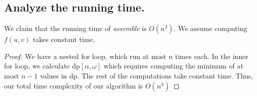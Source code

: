 \documentclass[11pt]{scrartcl}
\begin{document}
\subsection{
	Analyze the running time.
}
We claim that the running time of \textit{assemble} is $O(n^3)$. We assume computing $f(u,v)$ takes constant time. 

\begin{proof}
	We have a nested for loop, which run at most $n$ times each.
	In the inner for loop, we calculate dp$[\alpha,\omega]$ which requires computing the minimum of at most $n-1$ values 
	in dp. The rest of the computations take constant time.
	Thus, our total time complexity of our algorithm is $O(n^3)$
\end{proof}
\end{document}
